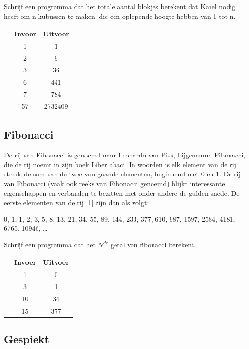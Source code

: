 Schrijf een programma dat het totale aantal blokjes berekent dat Karel nodig heeft om n kubussen te maken, die een oplopende hoogte hebben van 1 tot n.

\begin{tabular}{ p{5 mm} c c }
 & \textbf{Invoer} & \textbf{Uitvoer} \\
 & 1 & 1 \\
 & 2 & 9 \\
 & 3 & 36 \\
 & 6 & 441 \\
 & 7 & 784 \\
 & 57 & 2732409 \\
\end{tabular}

\subsection{Fibonacci}

De rij van Fibonacci is genoemd naar Leonardo van Pisa, bijgenaamd Fibonacci, die de rij noemt in zijn boek Liber abaci. In woorden is elk element van de rij steeds de som van de twee voorgaande elementen, beginnend met 0 en 1. De rij van Fibonacci (vaak ook reeks van Fibonacci genoemd) blijkt interessante eigenschappen en verbanden te bezitten met onder andere de gulden snede. De eerste elementen van de rij [1] zijn dan als volgt:

0, 1, 1, 2, 3, 5, 8, 13, 21, 34, 55, 89, 144, 233, 377, 610, 987, 1597, 2584, 4181, 6765, 10946, \ldots

Schrijf een programma dat het $N^{de}$ getal van fibonacci berekent.

\begin{tabular}{ p{5 mm} c c }
 & \textbf{Invoer} & \textbf{Uitvoer} \\
 & 1 & 0 \\
 & 3 & 1 \\
 & 10 & 34 \\
 & 15 & 377 \\
\end{tabular}

\subsection{Gespiekt}

